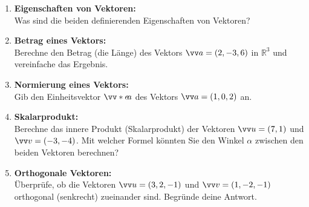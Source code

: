 \documentclass[11pt, a4paper]{article}
\begin{document}
\begin{enumerate}[label=\textbf{\arabic*.},itemsep=0.50cm]
    \item \textbf{Eigenschaften von Vektoren:} \\
    Was sind die beiden definierenden Eigenschaften von Vektoren?
    
    \item \textbf{Betrag eines Vektors:} \\
    Berechne den Betrag (die Länge) des Vektors $\ivec{a} = (2, -3, 6)$ in $\mathbb{R}^3$ und vereinfache das Ergebnis.
    
    \item \textbf{Normierung eines Vektors:} \\
    Gib den Einheitsvektor $\ivecS{e}{a}$ des Vektors $\ivec{a} = (1, 0, 2)$ an.
    
    \item \textbf{Skalarprodukt:} \\
    Berechne das innere Produkt (Skalarprodukt) der Vektoren $\ivec{u} = (7, 1)$ und $\ivec{v} = (-3, -4)$.
    Mit welcher Formel könnten Sie den Winkel $\alpha$ zwischen den beiden Vektoren berechnen?
    
    \item \textbf{Orthogonale Vektoren:} \\
    Überprüfe, ob die Vektoren $\ivec{u} = (3, 2, -1)$ und $\ivec{v} = (1, -2, -1)$ orthogonal (senkrecht) zueinander sind. 
    Begründe deine Antwort.
    
\end{enumerate}
\end{document}
